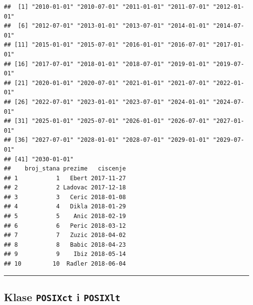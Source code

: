 \documentclass[]{book}
\newenvironment{Shaded}{\begin{snugshade}}{\end{snugshade}}
\newcommand{\KeywordTok}[1]{\textcolor[rgb]{0.13,0.29,0.53}{\textbf{#1}}}
\newcommand{\DataTypeTok}[1]{\textcolor[rgb]{0.13,0.29,0.53}{#1}}
\newcommand{\StringTok}[1]{\textcolor[rgb]{0.31,0.60,0.02}{#1}}
\newcommand{\OperatorTok}[1]{\textcolor[rgb]{0.81,0.36,0.00}{\textbf{#1}}}
\newcommand{\NormalTok}[1]{#1}
\theoremstyle{definition}
\theoremstyle{definition}
\theoremstyle{definition}
\theoremstyle{remark}
\begin{document}
\begin{Shaded}
\end{Shaded}

\begin{verbatim}
##  [1] "2010-01-01" "2010-07-01" "2011-01-01" "2011-07-01" "2012-01-01"
##  [6] "2012-07-01" "2013-01-01" "2013-07-01" "2014-01-01" "2014-07-01"
## [11] "2015-01-01" "2015-07-01" "2016-01-01" "2016-07-01" "2017-01-01"
## [16] "2017-07-01" "2018-01-01" "2018-07-01" "2019-01-01" "2019-07-01"
## [21] "2020-01-01" "2020-07-01" "2021-01-01" "2021-07-01" "2022-01-01"
## [26] "2022-07-01" "2023-01-01" "2023-07-01" "2024-01-01" "2024-07-01"
## [31] "2025-01-01" "2025-07-01" "2026-01-01" "2026-07-01" "2027-01-01"
## [36] "2027-07-01" "2028-01-01" "2028-07-01" "2029-01-01" "2029-07-01"
## [41] "2030-01-01"
##    broj_stana prezime   ciscenje
## 1           1   Ebert 2017-11-27
## 2           2 Ladovac 2017-12-18
## 3           3   Ceric 2018-01-08
## 4           4   Dikla 2018-01-29
## 5           5    Anic 2018-02-19
## 6           6   Peric 2018-03-12
## 7           7   Zuzic 2018-04-02
## 8           8   Babic 2018-04-23
## 9           9    Ibiz 2018-05-14
## 10         10  Radler 2018-06-04
\end{verbatim}

\begin{center}\rule{0.5\linewidth}{\linethickness}\end{center}

\subsection{\texorpdfstring{Klase \texttt{POSIXct} i
\texttt{POSIXlt}}{Klase POSIXct i POSIXlt}}\label{klase-posixct-i-posixlt}
\end{document}
